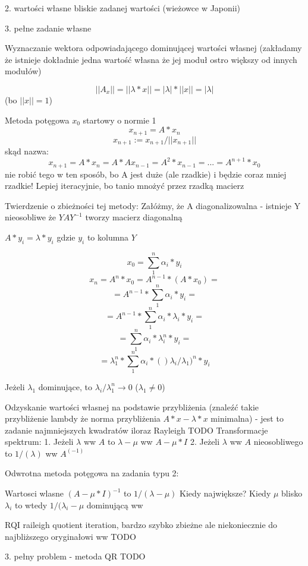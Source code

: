 \documentclass{article}
\begin{document}
2. wartości własne bliskie zadanej wartości (wieżowce w Japonii)

3. pełne zadanie własne

Wyznaczanie wektora odpowiadającego dominującej wartości własnej (zakładamy że istnieje dokładnie jedna wartość własna że jej moduł ostro większy od innych modułów)

$$||A_x|| = ||\lambda*x|| = |\lambda| * ||x|| = |\lambda| $$ (bo $||x|| = 1$)

Metoda potęgowa
$x_0$ startowy o normie 1
$$x_{n+1} = A * x_n$$
$$x_{n+1} := x_{n+1}/||x_{n+1}|| $$
skąd nazwa:
$$x_{n+1} = A*x_n = A*Ax_{n-1} = A^2*x_{n-1} = ... = A^{n+1}*x_0 $$
nie robić tego w ten sposób, bo A jest duże (ale rzadkie) i będzie coraz mniej rzadkie!
Lepiej iteracyjnie, bo tanio mnożyć przez rzadką macierz

Twierdzenie o zbieżności tej metody:
Załóżmy, że A diagonalizowalna - istnieje Y nieosobliwe że
$YAY^{-1}$ tworzy macierz diagonalną

$A*y_i = \lambda*y_i$ gdzie $y_i$ to kolumna $Y$

$$ x_0 = \sum_{1}^{n} \alpha_i * y_i $$
$$x_n = A^n*x_0 = A^{n-1}*(A*x_0) = $$
$$ = A^{n-1}*\sum_{1}^{n} \alpha_i*y_i = $$
$$ = A^{n-1}*\sum_{1}^{n} \alpha_i*\lambda_i*y_i = $$
$$= \sum_{1}^{n} \alpha_i*\lambda_i^n*y_i = $$
$$= \lambda_1^n *\sum_{1}^{n} \alpha_i*()\lambda_i/\lambda_1)^n*y_i$$

Jeżeli $\lambda_1$ dominujące, to $\lambda_i/\lambda_1^n \rightarrow 0 $
($\lambda_1 \neq 0 $)

Odzyskanie wartości własnej na podstawie przybliżenia (znaleźć takie przybliżenie lambdy że norma przybliżenia $A*x-\lambda*x$  minimalna) - jest to zadanie najmniejszych kwadratów
iloraz Rayleigh TODO
Transformacje spektrum:
1. Jeżeli $\lambda$ ww $A$ to $\lambda-\mu$ ww $A-\mu*I$
2. Jeżeli $\lambda$ ww $A$ nieosobliwego to $1/(\lambda)$ ww $A^(-1)$

Odwrotna metoda potęgowa na zadania typu 2:

Wartosci wlasne $(A - \mu*I)^{-1}$ to $1/(\lambda-\mu) $
Kiedy największe? Kiedy $\mu$ blisko $\lambda_i$ to wtedy $1/(\lambda_i - \mu$ dominującą ww

RQI raileigh quotient iteration, bardzo szybko zbieżne ale niekoniecznie do najbliższego oryginałowi ww TODO

3. pełny problem - metoda QR TODO
\end{document}
